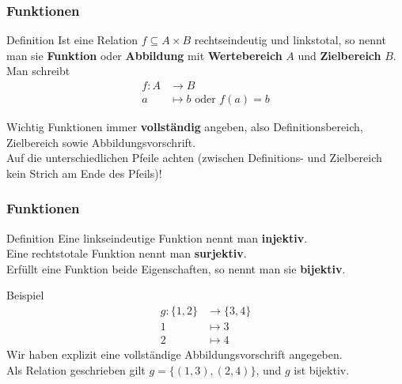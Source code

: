 \begin{frame}
	\frametitle{Funktionen}
	\begin{block}{Definition}
		Ist eine Relation $f \subseteq A \times B$ rechtseindeutig und linkstotal, so nennt man sie \textbf{Funktion} oder \textbf{Abbildung} mit \textbf{Wertebereich} $A$ und \textbf{Zielbereich} $B$.\\[1em]
		Man schreibt 
		\begin{align*}
			f : A &\to B \\
			a &\mapsto b \text{ oder } f(a) = b
		\end{align*}
	\end{block}

	\pause
	\begin{block}{Wichtig}
		Funktionen immer \textbf{vollständig} angeben, also Definitionsbereich, Zielbereich sowie Abbildungsvorschrift. \\
		Auf die unterschiedlichen Pfeile achten (zwischen Definitions- und Zielbereich kein Strich am Ende des Pfeils)!
	\end{block}
\end{frame}

\begin{frame}
	\frametitle{Funktionen}
	
	\begin{block}{Definition}
		Eine linkseindeutige Funktion nennt man \textbf{injektiv}. \\
		Eine rechtstotale Funktion nennt man \textbf{surjektiv}. \\
		Erfüllt eine Funktion beide Eigenschaften, so nennt man sie \textbf{bijektiv}.
	\end{block}

	\begin{block}{Beispiel}
		\begin{align*}
			g : \{1, 2\} &\to \{3, 4\} \\
			1 &\mapsto 3 \\
			2 &\mapsto 4
		\end{align*}
		Wir haben explizit eine vollständige Abbildungsvorschrift angegeben.\\
		Als Relation geschrieben gilt $g = \{(1, 3), (2, 4)\}$, und $g$ ist bijektiv.
	\end{block}

\end{frame}

